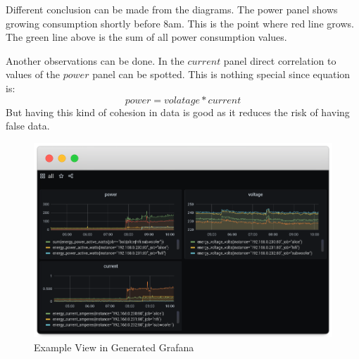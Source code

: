 Different conclusion can be made from the diagrams. The power panel shows growing consumption shortly before 8am. This is the point where red line grows. The green line above is the sum of all power consumption values. 

Another observations can be done. In the $current$ panel direct correlation to values of the $power$ panel can be spotted. This is nothing special since equation is:
\begin{equation*}
power = volatage * current
\end{equation*}
But having this kind of cohesion in data is good as it reduces the risk of having false data. 


\begin{figure}[!ht]
	\includegraphics[width=\linewidth]{assets/images/dashboard_all}
	\caption{Example View in Generated Grafana}
	\label{fig:grafana}
\end{figure}